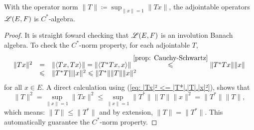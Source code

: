 \begin{proposicao}
    With the operator norm $\|T\| \coloneqq \sup_{\|x\|=1} \|Tx\|$, the adjointable operators $\mathscr L(E,F)$ is $C^*$-algebra.
    \begin{proof}
    It is straight foward checking that $\mathscr L(E,F)$ is an involution Banach algebra. To check the $C^*$-norm property, for each adjointable $T$,
    \begin{equation}
    \label{eq: |Tx|² <= |T*|.|T|.|x|²}
        \begin{array}{rcl}
            \|Tx\|^2 &=& \|\langle {Tx},{Tx}\rangle\| = \|\langle {T^*Tx},{x}\rangle\| \overset{\ref{prop: Cauchy-Schwartz}}{\leqslant} \|T^*Tx\|\|x\| \\
            &\leqslant & \|T^*T\|\|x\|^2 \leqslant \|T^*\|\|T\| \|x\|^2 
        \end{array}
    \end{equation}
    for all $x\in E$. A direct calculation using (\ref{eq: |Tx|² <= |T*|.|T|.|x|²}), shows that
    \[
    \|T\|^2 = \sup_{\|x\|=1} \|Tx\|^2 \leq \sup_{\|x\|=1} \|T^*\|\|T\|\|x\|^2 = \|T^*\|\|T\|,
    \]
    which means: $\|T\| \leq \|T^*\|$ and by extension, $\|T\|=\|T^*\|$. This automatically guarantee the $C^*$-norm property.
    \end{proof}
\end{proposicao}
    
